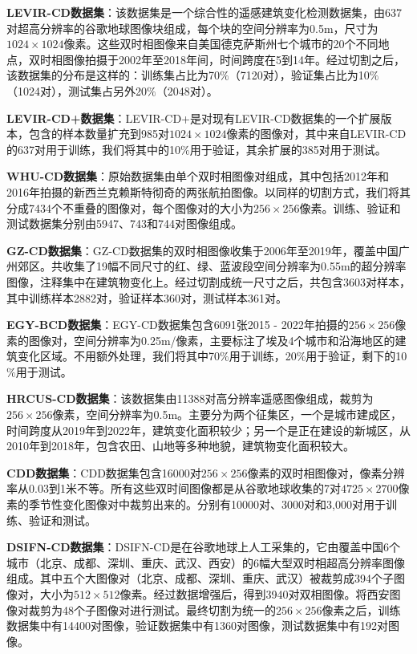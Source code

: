 \documentclass[lang=chs, degree=master, blindreview=false, adobe=false]{yanputhesis}
\begin{document}
\textbf{LEVIR-CD数据集}：该数据集是一个综合性的遥感建筑变化检测数据集，由637对超高分辨率的谷歌地球图像块组成，每个块的空间分辨率为0.5m，尺寸为$1024\times1024$像素。这些双时相图像来自美国德克萨斯州七个城市的20个不同地点，双时相图像拍摄于2002年至2018年间，时间跨度在5到14年。经过切割之后，该数据集的分布是这样的：训练集占比为70$\%$（7120对），验证集占比为10$\%$（1024对），测试集占另外20$\%$（2048对）。

\textbf{LEVIR-CD+数据集}：LEVIR-CD+是对现有LEVIR-CD数据集的一个扩展版本，包含的样本数量扩充到985对$1024\times1024$像素的图像对，其中来自LEVIR-CD的637对用于训练，我们将其中的10$\%$用于验证，其余扩展的385对用于测试。

\textbf{WHU-CD数据集}：原始数据集由单个双时相图像对组成，其中包括2012年和2016年拍摄的新西兰克赖斯特彻奇的两张航拍图像。以同样的切割方式，我们将其分成7434个不重叠的图像对，每个图像对的大小为$256\times256$像素。训练、验证和测试数据集分别由5947、743和744对图像组成。

\textbf{GZ-CD数据集}：GZ-CD数据集的双时相图像收集于2006年至2019年，覆盖中国广州郊区。共收集了19幅不同尺寸的红、绿、蓝波段空间分辨率为0.55m的超分辨率图像，注释集中在建筑物变化上。经过切割成统一尺寸之后，共包含3603对样本，其中训练样本2882对，验证样本360对，测试样本361对。

\textbf{EGY-BCD数据集}：EGY-CD数据集包含6091张2015 - 2022年拍摄的$256 \times 256$像素的图像对，空间分辨率为0.25m/像素，主要标注了埃及4个城市和沿海地区的建筑变化区域。不用额外处理，我们将其中70$\%$用于训练，20$\%$用于验证，剩下的10$\%$用于测试。

\textbf{HRCUS-CD数据集}：该数据集由11388对高分辨率遥感图像组成，裁剪为$256 \times 256$像素，空间分辨率为0.5m。主要分为两个征集区，一个是城市建成区，时间跨度从2019年到2022年，建筑变化面积较少；另一个是正在建设的新城区，从2010年到2018年，包含农田、山地等多种地貌，建筑物变化面积较大。

\textbf{CDD数据集}：CDD数据集包含16000对$256\times256$像素的双时相图像对，像素分辨率从0.03到1米不等。所有这些双时间图像都是从谷歌地球收集的7对$4725\times2700$像素的季节性变化图像对中裁剪出来的。分别有10000对、3000对和3,000对用于训练、验证和测试。

\textbf{DSIFN-CD数据集}：DSIFN-CD是在谷歌地球上人工采集的，它由覆盖中国6个城市（北京、成都、深圳、重庆、武汉、西安）的6幅大型双时相超高分辨率图像组成。其中五个大图像对（北京、成都、深圳、重庆、武汉）被裁剪成394个子图像对，大小为$512\times512$像素。经过数据增强后，得到3940对双相图像。将西安图像对裁剪为48个子图像对进行测试。最终切割为统一的$256\times256$像素之后，训练数据集中有14400对图像，验证数据集中有1360对图像，测试数据集中有192对图像。
\end{document}
